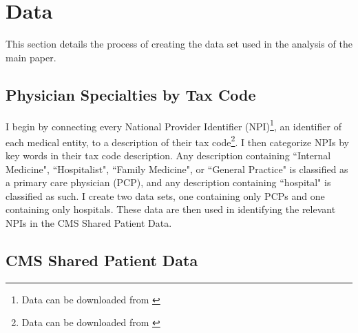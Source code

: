 \documentclass[12pt]{article}
\begin{document}
\clearpage
\onehalfspacing

\printbibliography

\clearpage


\appendix

\section{Data}\label{app:data}

This section details the process of creating the data set used in the analysis of the main paper. 

\subsection{Physician Specialties by Tax Code}\label{sec:taxcode}

I begin by connecting every National Provider Identifier (NPI)\footnote{Data can be downloaded from \hyperlink{https://download.cms.gov/nppes/NPI/Files.html}{}}, an identifier of each medical entity, to a description of their tax code\footnote{Data can be downloaded from \hyperlink{https://nucc.org/index.php/code-sets-mainmenu-41/provider-taxonomy-mainmenu-40/pdf-mainmenu-53}{}}. I then categorize NPIs by key words in their tax code description. Any description containing ``Internal Medicine", ``Hospitalist", ``Family Medicine", or ``General Practice" is classified as a primary care physician (PCP), and any description containing ``hospital" is classified as such. I create two data sets, one containing only PCPs and one containing only hospitals. These data are then used in identifying the relevant NPIs in the CMS Shared Patient Data. 



\subsection{CMS Shared Patient Data}\label{sec:sharedpat}
\end{document}
